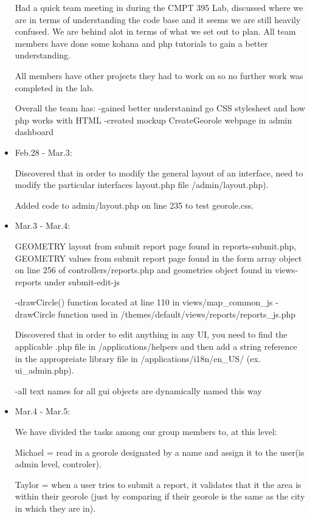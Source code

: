 \documentclass{article}
\begin{document}
\begin{itemize}
Had a quick team meeting in during the CMPT 395 Lab, discussed where we are in terms of understanding the code base and it seems we are still heavily confused.  We are behind alot in terms of what we set out to plan.  All team members have done some kohana and php tutorials to gain a better understanding.
	
All members have other projects they had to work on so no further work was completed in the lab.

Overall the team has: 
-gained better understanind go CSS stylesheet and how php works with HTML
-created mockup CreateGeorole webpage in admin dashboard
	
\item Feb.28 - Mar.3:

Discovered that in order to modify the general layout of an interface, need to modify the particular interfaces layout.php file /admin/layout.php).
	
Added code to admin/layout.php on line 235 to test georole.css.
	
\item Mar.3 - Mar.4:  

GEOMETRY layout from submit report page found in reports-submit.php, GEOMETRY values from submit report page found in the form array object on line 256 of controllers/reports.php and geometries object found in views-reports under submit-edit-js

-drawCircle() function located at line 110 in views/map\_common\_js
-drawCircle function used in /themes/default/views/reports/reports\_js.php  

Discovered that in order to edit anything in any UI, you need to find the applicable .php file in /applications/helpers and then add a string reference in the appropreiate library file in /applications/i18n/en\_US/ (ex. ui\_admin.php).
	
-all text names for all gui objects are dynamically named this way

\item Mar.4 - Mar.5:

We have divided the tasks among our group members to, at this level:
   
Michael = read in a georole designated by a name and assign it to the user(is admin level, controler).

Taylor = when a user tries to submit a report, it validates that it the area is within their georole (just by comparing if their georole is the same as the city in which they are in).


\end{itemize}
\end{document}
